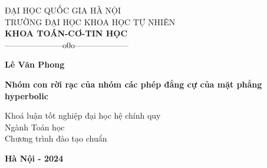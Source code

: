 \begin{titlepage}
		\setlength{\fboxsep}{1pt}
		\setlength{\fboxrule}{1.2pt}
	\vspace*{-0.5cm}
	\begin{center}
		{\fontsize{13pt}{1}\selectfont  ĐẠI HỌC QUỐC GIA HÀ NỘI} \\
			{\fontsize{13pt}{1}\selectfont  TRƯỜNG ĐẠI HỌC KHOA HỌC TỰ NHIÊN} \\
			{\fontsize{13pt}{1}\selectfont  \bf KHOA TOÁN-CƠ-TIN HỌC}\\
   {---------------------o0o--------------------}
	\end{center}
	\vspace*{2.5cm}
	\begin{center}
		{\bf\fontsize{14pt}{1}\selectfont Lê Văn Phong}
	\end{center}
	\vspace*{2.5cm}
	\begin{center}
		{\bf\fontsize{18pt}{1}\selectfont Nhóm con rời rạc của nhóm các phép đẳng cự của mặt phẳng hyperbolic}
	\end{center}
	\vspace*{0.5cm}
	\begin{center}
        {\fontsize{14pt}{1}\selectfont Khoá luận tốt nghiệp đại học hệ chính quy}\\
		{\fontsize{14pt}{1}\selectfont Ngành Toán học}\\
		{\fontsize{14pt}{1}\selectfont Chương trình đào tạo chuẩn}\\
	\end{center}
	\vspace*{0.5cm}
	
	\vfill
	\begin{center}
		{\bf\fontsize{14pt}{1}\selectfont Hà Nội - 2024}
	\end{center}
\end{titlepage}
